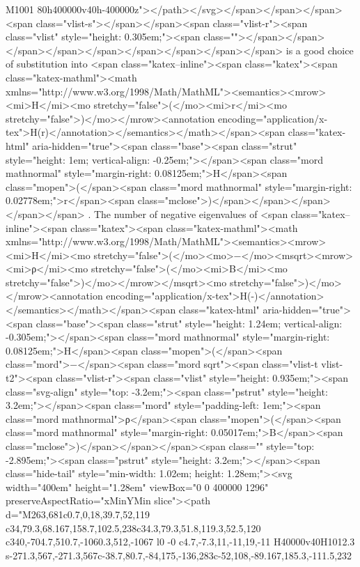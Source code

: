 M1001 80h400000v40h-400000z"></path></svg></span></span></span><span class="vlist-s">​</span></span><span class="vlist-r"><span class="vlist" style="height: 0.305em;"><span class=""></span></span></span></span></span></span></span></span></span> is a good choice of substitution into <span class="katex--inline"><span class="katex"><span class="katex-mathml"><math xmlns="http://www.w3.org/1998/Math/MathML"><semantics><mrow><mi>H</mi><mo stretchy="false">(</mo><mi>r</mi><mo stretchy="false">)</mo></mrow><annotation encoding="application/x-tex">H(r)</annotation></semantics></math></span><span class="katex-html" aria-hidden="true"><span class="base"><span class="strut" style="height: 1em; vertical-align: -0.25em;"></span><span class="mord mathnormal" style="margin-right: 0.08125em;">H</span><span class="mopen">(</span><span class="mord mathnormal" style="margin-right: 0.02778em;">r</span><span class="mclose">)</span></span></span></span></span> . The number of negative eigenvalues of <span class="katex--inline"><span class="katex"><span class="katex-mathml"><math xmlns="http://www.w3.org/1998/Math/MathML"><semantics><mrow><mi>H</mi><mo stretchy="false">(</mo><mo>−</mo><msqrt><mrow><mi>ρ</mi><mo stretchy="false">(</mo><mi>B</mi><mo stretchy="false">)</mo></mrow></msqrt><mo stretchy="false">)</mo></mrow><annotation encoding="application/x-tex">H(-)</annotation></semantics></math></span><span class="katex-html" aria-hidden="true"><span class="base"><span class="strut" style="height: 1.24em; vertical-align: -0.305em;"></span><span class="mord mathnormal" style="margin-right: 0.08125em;">H</span><span class="mopen">(</span><span class="mord">−</span><span class="mord sqrt"><span class="vlist-t vlist-t2"><span class="vlist-r"><span class="vlist" style="height: 0.935em;"><span class="svg-align" style="top: -3.2em;"><span class="pstrut" style="height: 3.2em;"></span><span class="mord" style="padding-left: 1em;"><span class="mord mathnormal">ρ</span><span class="mopen">(</span><span class="mord mathnormal" style="margin-right: 0.05017em;">B</span><span class="mclose">)</span></span></span><span class="" style="top: -2.895em;"><span class="pstrut" style="height: 3.2em;"></span><span class="hide-tail" style="min-width: 1.02em; height: 1.28em;"><svg width="400em" height="1.28em" viewBox="0 0 400000 1296" preserveAspectRatio="xMinYMin slice"><path d="M263,681c0.7,0,18,39.7,52,119
c34,79.3,68.167,158.7,102.5,238c34.3,79.3,51.8,119.3,52.5,120
c340,-704.7,510.7,-1060.3,512,-1067
l0 -0
c4.7,-7.3,11,-11,19,-11
H40000v40H1012.3
s-271.3,567,-271.3,567c-38.7,80.7,-84,175,-136,283c-52,108,-89.167,185.3,-111.5,232
